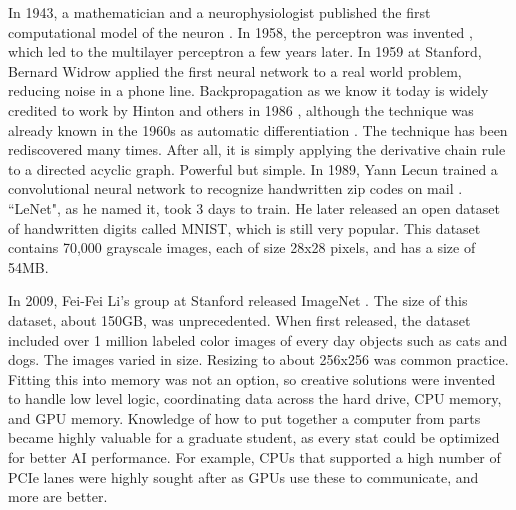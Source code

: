 
In 1943, a mathematician and a neurophysiologist published the first computational model of the neuron \cite{mcculloch1943logical}.  In 1958, the perceptron was invented \cite{rosenblatt1958perceptron}, which led to the multilayer perceptron a few years later.  In 1959 at Stanford, Bernard Widrow applied the first neural network to a real world problem, reducing noise in a phone line.  Backpropagation as we know it today is widely credited to work by Hinton and others in 1986 \cite{rumelhart1986learning}, although the technique was already known in the 1960s as automatic differentiation \cite{wengert1964simple}.  The technique has been rediscovered many times.  After all, it is simply applying the derivative chain rule to a directed acyclic graph.  Powerful but simple.  In 1989, Yann Lecun trained a convolutional neural network to recognize handwritten zip codes on mail \cite{lecun1989backpropagation}. ``LeNet", as he named it, took 3 days to train.  He later released an open dataset of handwritten digits called MNIST, which is still very popular.  This dataset contains 70,000 grayscale images, each of size 28x28 pixels, and has a size of 54MB.

In 2009, Fei-Fei Li's group at Stanford released ImageNet \cite{deng2009imagenet}.  The size of this dataset, about 150GB, was unprecedented.  When first released, the dataset included over 1 million labeled color images of every day objects such as cats and dogs.  The images varied in size. Resizing to about 256x256 was common practice.  Fitting this into memory was not an option, so creative solutions were invented to handle low level logic, coordinating data across the hard drive, CPU memory, and GPU memory.  Knowledge of how to put together a computer from parts became highly valuable for a graduate student, as every stat could be optimized for better AI performance.  For example, CPUs that supported a high number of PCIe lanes were highly sought after as GPUs use these to communicate, and more are better.

